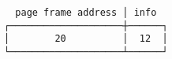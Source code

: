 \documentclass[varwidth,crop]{standalone}
\begin{document}
\begin{verbatim}
  page frame address │ info                                     
┌────────────────────┼──────┐
│        20          │  12  │ 
└────────────────────┴──────┘
\end{verbatim}
\end{document}
